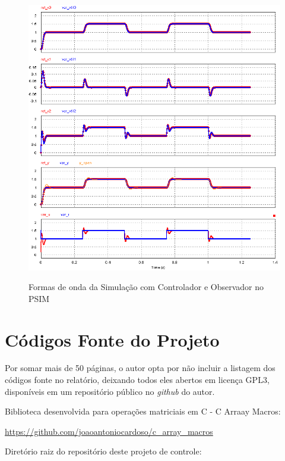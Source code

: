 \documentclass[
	12pt,				%
	article,			%
	openright,			%
	oneside,
	a4paper,			%
	chapter=TITLE,		%
	section=TITLE,		%
	english,			%
	french,				%
	spanish,			%
	brazil,				%
]{abntex2}
\begin{document}
\begin{apendicesenv}
            \begin{figure}[htbp]
            	\centering
            	\caption{Formas de onda da Simulação com Controlador e Observador no PSIM}
            	\includegraphics[width=\textwidth,keepaspectratio]{tex/imgs/psim/waveforms.png}
            	\label{fig-psim_waveforms}
        	\end{figure}
        	
    	\clearpage
        \chapter{Códigos Fonte do Projeto}
            \label{ap-scripts}
            Por somar mais de 50 páginas, o autor opta por não incluir a listagem dos códigos fonte no relatório, deixando todos  eles abertos em licença GPL3, disponíveis em um repositório público no \textit{github} do autor.
            
            Biblioteca desenvolvida para operações matriciais em C - C Arraay Macros:
            
            \url{https://github.com/joaoantoniocardoso/c_array_macros}
            
            Diretório raiz do repositório deste projeto de controle:
            

\end{apendicesenv}
\end{document}
